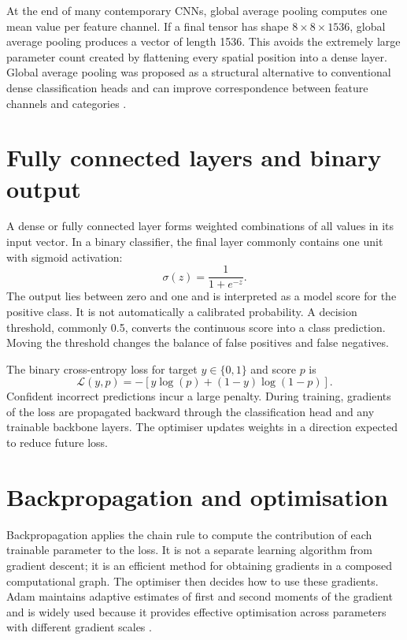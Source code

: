 At the end of many contemporary CNNs, global average pooling computes one mean value per feature channel. If a final tensor has shape $8\times8\times1536$, global average pooling produces a vector of length 1536. This avoids the extremely large parameter count created by flattening every spatial position into a dense layer. Global average pooling was proposed as a structural alternative to conventional dense classification heads and can improve correspondence between feature channels and categories \citep{lin2013network}.

\section{Fully connected layers and binary output}
A dense or fully connected layer forms weighted combinations of all values in its input vector. In a binary classifier, the final layer commonly contains one unit with sigmoid activation:
\begin{equation}
\sigma(z)=\frac{1}{1+e^{-z}}.
\end{equation}
The output lies between zero and one and is interpreted as a model score for the positive class. It is not automatically a calibrated probability. A decision threshold, commonly 0.5, converts the continuous score into a class prediction. Moving the threshold changes the balance of false positives and false negatives.

The binary cross-entropy loss for target $y\in\{0,1\}$ and score $p$ is
\begin{equation}
\mathcal{L}(y,p)=-\left[y\log(p)+(1-y)\log(1-p)\right].
\end{equation}
Confident incorrect predictions incur a large penalty. During training, gradients of the loss are propagated backward through the classification head and any trainable backbone layers. The optimiser updates weights in a direction expected to reduce future loss.

\section{Backpropagation and optimisation}
Backpropagation applies the chain rule to compute the contribution of each trainable parameter to the loss. It is not a separate learning algorithm from gradient descent; it is an efficient method for obtaining gradients in a composed computational graph. The optimiser then decides how to use these gradients. Adam maintains adaptive estimates of first and second moments of the gradient and is widely used because it provides effective optimisation across parameters with different gradient scales \citep{kingma2014adam}.

